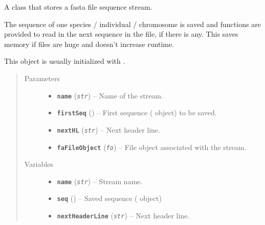 \documentclass[letterpaper,10pt,english]{sphinxmanual}
\begin{document}
\begin{fulllineitems}
\label{fasta:libPoMo.fasta.FaStream}
A class that stores a fasta file sequence stream.

The sequence of one species / individual / chromosome is saved and
functions are provided to read in the next sequence in the file,
if there is any. This saves memory if files are huge and doesn't
increase runtime.

This object is usually initialized with {\hyperref[fasta:libPoMo.fasta.init_seq]{}}.
\begin{quote}\begin{description}
\item[{Parameters}] \leavevmode\begin{itemize}
\item {} 
\textbf{\texttt{name}} (\emph{\texttt{str}}) -- Name of the stream.

\item {} 
\textbf{\texttt{firstSeq}} ({\hyperref[seqbase:libPoMo.seqbase.Seq]{}}) -- First sequence ({\hyperref[seqbase:libPoMo.seqbase.Seq]{}} object) to be saved.

\item {} 
\textbf{\texttt{nextHL}} (\emph{\texttt{str}}) -- Next header line.

\item {} 
\textbf{\texttt{faFileObject}} (\emph{\texttt{fo}}) -- File object associated with the stream.

\end{itemize}

\item[{Variables}] \leavevmode\begin{itemize}
\item {} 
\textbf{\texttt{name}} (\emph{\texttt{str}}) -- Stream name.

\item {} 
\textbf{\texttt{seq}} ({\hyperref[seqbase:libPoMo.seqbase.Seq]{}}) -- Saved sequence ({\hyperref[seqbase:libPoMo.seqbase.Seq]{}} object)

\item {} 
\textbf{\texttt{nextHeaderLine}} (\emph{\texttt{str}}) -- Next header line.


\end{itemize}
\end{description}
\end{quote}
\end{fulllineitems}
\end{document}
